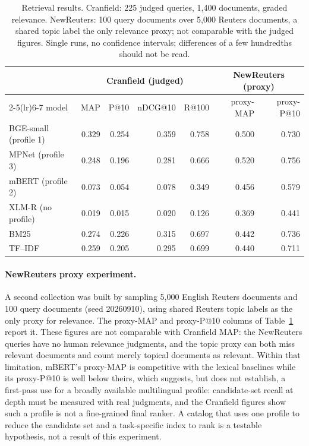 \documentclass[11pt]{article}
\begin{document}
\begin{table}[t]
\centering
\caption{Retrieval results. Cranfield: 225 judged queries, 1,400 documents,
graded relevance. NewReuters: 100 query documents over 5,000 Reuters
documents, a shared topic label the only relevance proxy; not comparable with
the judged figures. Single runs, no confidence intervals; differences of a
few hundredths should not be read.}
\label{tab:results}
\small
\begin{tabular}{@{}lrrrrrr@{}}
\toprule
 & \multicolumn{4}{c}{Cranfield (judged)} & \multicolumn{2}{c}{NewReuters (proxy)} \\
\cmidrule(lr){2-5}\cmidrule(lr){6-7}
model & MAP & P@10 & nDCG@10 & R@100 & proxy-MAP & proxy-P@10 \\
\midrule
BGE-small (profile 1) & 0.329 & 0.254 & 0.359 & 0.758 & 0.500 & 0.730 \\
MPNet (profile 3)     & 0.248 & 0.196 & 0.281 & 0.666 & 0.520 & 0.756 \\
mBERT (profile 2)     & 0.073 & 0.054 & 0.078 & 0.349 & 0.456 & 0.579 \\
XLM-R (no profile)    & 0.019 & 0.015 & 0.020 & 0.126 & 0.369 & 0.441 \\
BM25                  & 0.274 & 0.226 & 0.315 & 0.697 & 0.442 & 0.736 \\
TF--IDF               & 0.259 & 0.205 & 0.295 & 0.699 & 0.440 & 0.711 \\
\bottomrule
\end{tabular}
\end{table}

\paragraph{NewReuters proxy experiment.} A second collection was built by
sampling 5,000 English Reuters documents and 100 query documents (seed
20260910), using shared Reuters topic labels as the only proxy for relevance.
The proxy-MAP and proxy-P@10 columns of Table~\ref{tab:results} report it.
These figures are not comparable with Cranfield MAP: the NewReuters queries
have no human relevance judgments, and the topic proxy can both miss relevant
documents and count merely topical documents as relevant. Within that
limitation, mBERT's proxy-MAP is competitive with the lexical baselines while
its proxy-P@10 is well below theirs, which suggests, but does not establish,
a first-pass use for a broadly available multilingual profile: candidate-set
recall at depth must be measured with real judgments, and the Cranfield
figures show such a profile is not a fine-grained final ranker. A catalog
that uses one profile to reduce the candidate set and a task-specific index
to rank is a testable hypothesis, not a result of this experiment.
\end{document}
